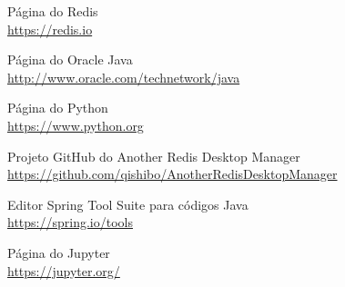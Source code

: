 \documentclass[a4paper,11pt]{article}
\begin{document}



\begin{thebibliography}{8}
  Página do Redis \\
  \url{https://redis.io}

  Página do Oracle Java \\
  \url{http://www.oracle.com/technetwork/java}
  
  Página do Python \\
  \url{https://www.python.org}

  Projeto GitHub do Another Redis Desktop Manager \\
  \url{https://github.com/qishibo/AnotherRedisDesktopManager}

  Editor Spring Tool Suite para códigos Java \\
  \url{https://spring.io/tools}

  Página do Jupyter \\
  \url{https://jupyter.org/}

  
\end{thebibliography}
  
\end{document}
